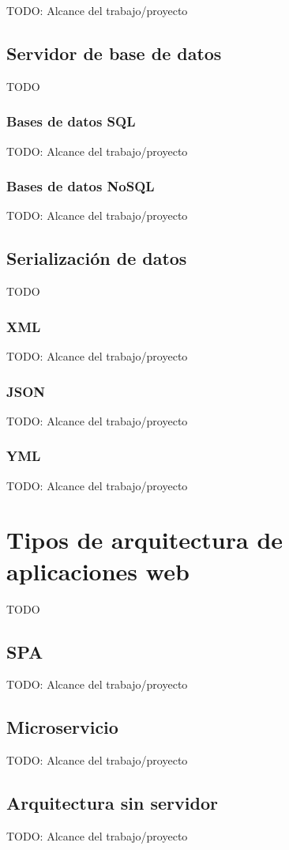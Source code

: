 TODO: Alcance del trabajo/proyecto

\subsection{Servidor de base de datos}

TODO

\subsubsection{Bases de datos SQL}

TODO: Alcance del trabajo/proyecto

\subsubsection{Bases de datos NoSQL}

TODO: Alcance del trabajo/proyecto

\subsection{Serialización de datos}

TODO

\subsubsection{XML}

TODO: Alcance del trabajo/proyecto

\subsubsection{JSON}

TODO: Alcance del trabajo/proyecto

\subsubsection{YML}

TODO: Alcance del trabajo/proyecto

\section{Tipos de arquitectura de aplicaciones web}

TODO

\subsection{SPA}

TODO: Alcance del trabajo/proyecto

\subsection{Microservicio}

TODO: Alcance del trabajo/proyecto

\subsection{Arquitectura sin servidor}

TODO: Alcance del trabajo/proyecto
